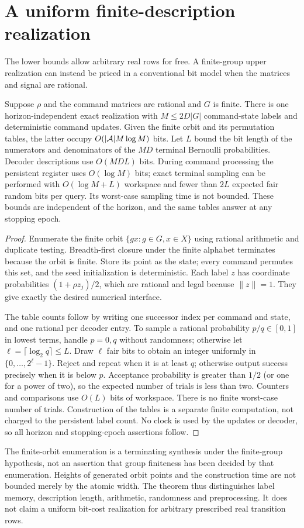 \section{A uniform finite-description realization}\label{sec:uniform52}
The lower bounds allow arbitrary real rows for free. A finite-group
upper realization can instead be priced in a conventional bit model
when the matrices and signal are rational.

\begin{theorem}
\label{thm:uniform52}
Suppose $\rho$ and the command matrices are rational and $G$ is finite.
There is one horizon-independent exact realization with
$M\le2D|G|$ command-state labels and deterministic command updates.
Given the finite orbit and its permutation tables, the latter occupy
$O(|\mathcal A|M\log M)$ bits. Let $L$ bound the bit length of the
numerators and denominators of the $MD$ terminal Bernoulli
probabilities. Decoder descriptions use $O(MDL)$ bits. During command
processing the persistent register uses $O(\log M)$ bits; exact
terminal sampling can be performed with $O(\log M+L)$ workspace and
fewer than $2L$ expected fair random bits per query. Its worst-case
sampling time is not bounded. These bounds are independent of the
horizon, and the same tables answer at any stopping epoch.
\end{theorem}
\begin{proof}
Enumerate the finite orbit $\{gx:g\in G,x\in X\}$ using rational
arithmetic and duplicate testing. Breadth-first closure under the
finite alphabet terminates because the orbit is finite. Store its
point as the state; every command permutes this set, and the seed
initialization is deterministic. Each label $z$ has coordinate
probabilities $(1+\rho z_j)/2$, which are rational and legal because
$\|z\|=1$. They give exactly the desired numerical interface.

The table counts follow by writing one successor index per command
and state, and one rational per decoder entry. To sample a rational
probability $p/q\in[0,1]$ in lowest terms, handle $p=0,q$ without
randomness; otherwise let $\ell=\lceil\log_2q\rceil\le L$.
Draw $\ell$ fair bits to obtain an integer uniformly in
$\{0,\ldots,2^\ell-1\}$. Reject and repeat when it is at least $q$;
otherwise output success precisely when it is below $p$. Acceptance
probability is greater than $1/2$ (or one for a power of two), so the
expected number of trials is less than two. Counters and comparisons
use $O(L)$ bits of workspace. There is no finite worst-case number
of trials. Construction of the tables is a separate finite computation,
not charged to the persistent label count. No clock is used by the
updates or decoder, so all horizon and stopping-epoch assertions follow.
\end{proof}

The finite-orbit enumeration is a terminating synthesis under the
finite-group hypothesis, not an assertion that group finiteness has
been decided by that enumeration. Heights of generated orbit points
and the construction time are not bounded merely by the atomic width.
The theorem thus distinguishes label memory, description length,
arithmetic, randomness and preprocessing. It does not claim a uniform
bit-cost realization for arbitrary prescribed real transition rows.
